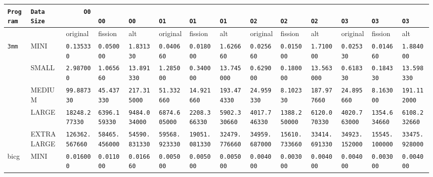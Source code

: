 \begin{tabular}{l | l | l | l | l | l | l | l | l | l | l | l | l | l} \hline
    \verb|Program | & \verb|Data Size | & \verb|     O0      | & \verb|     O0     | & \verb|     O0     | & \verb|     O1     | & \verb|     O1     | & \verb|     O1     | & \verb|     O2     | & \verb|     O2     | & \verb|     O2     | & \verb|     O3     | & \verb|     O3     | & \verb|     O3     | \\ \hline
    \hline
             &            & original      & fission      & alt          & original     & fission      & alt          & original     & fission      & alt          & original     & fission      & alt          \\ \hline
    \verb|3mm     | & MINI       & \verb|0.135330     | & \verb|0.050000    | & \verb|1.831330    | & \verb|0.040660    | & \verb|0.018000    | & \verb|1.626660    | & \verb|0.025660    | & \verb|0.015000    | & \verb|1.710000    | & \verb|0.025330    | & \verb|0.014660    | & \verb|1.884000    | \\ \hline
             & SMALL      & \verb|2.987000     | & \verb|1.065660    | & \verb|13.891330   | & \verb|1.285000    | & \verb|0.340000    | & \verb|13.745000   | & \verb|0.629000    | & \verb|0.180000    | & \verb|13.563000   | & \verb|0.618330    | & \verb|0.184330    | & \verb|13.598330   | \\ \hline
             & MEDIUM     & \verb|99.887330    | & \verb|45.437330   | & \verb|217.315000  | & \verb|51.332660   | & \verb|14.921660   | & \verb|193.474330  | & \verb|24.959330   | & \verb|8.102330    | & \verb|187.977660  | & \verb|24.895660   | & \verb|8.163000    | & \verb|191.112000  | \\ \hline
             & LARGE      & \verb|18248.277330 | & \verb|6396.159330 | & \verb|9484.034000 | & \verb|6874.605000 | & \verb|2208.366330 | & \verb|5902.330660 | & \verb|4017.746330 | & \verb|1388.250000 | & \verb|6120.070330 | & \verb|4020.763000 | & \verb|1354.634660 | & \verb|6108.232660 | \\ \hline
             & EXTRALARGE & \verb|126362.567660| & \verb|58465.456000| & \verb|54590.831330| & \verb|59568.923330| & \verb|19051.081330| & \verb|32479.776660| & \verb|34959.687000| & \verb|15610.733660| & \verb|33414.691330| & \verb|34923.152000| & \verb|15545.100000| & \verb|33475.928000| \\ \hline
    bicg     & MINI       & \verb|0.016000     | & \verb|0.011000    | & \verb|0.016660    | & \verb|0.005000    | & \verb|0.005000    | & \verb|0.005000    | & \verb|0.004000    | & \verb|0.003000    | & \verb|0.004000    | & \verb|0.004000    | & \verb|0.003000    | & \verb|0.004000    | \\ \hline

\end{tabular}
